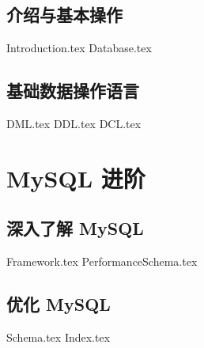 \documentclass{PionpillNote-book}
\begin{document}
\chapter{介绍与基本操作}
{Introduction.tex}
{Database.tex}
\chapter{基础数据操作语言}
{DML.tex}
{DDL.tex}
{DCL.tex}

\part{MySQL 进阶}
\chapter{深入了解 MySQL}
{Framework.tex}
{PerformanceSchema.tex}
\chapter{优化 MySQL}
{Schema.tex}
{Index.tex}
\end{document}
